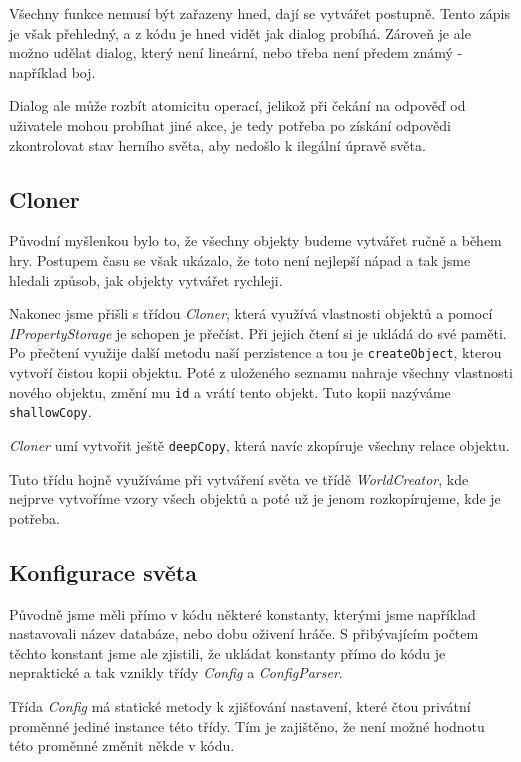\documentclass[11pt, a4paper]{article}
\def\class#1{\emph{#1}}
\begin{document}
Všechny funkce nemusí být zařazeny hned, dají se vytvářet postupně. Tento zápis je však přehledný, a z kódu je hned vidět jak dialog probíhá. Zároveň je ale možno udělat dialog, který není lineární, nebo třeba není předem známý - například boj.

Dialog ale může rozbít atomicitu operací, jelikož při čekání na odpověď od uživatele mohou probíhat jiné akce, je tedy potřeba po získání odpovědi zkontrolovat stav herního světa, aby nedošlo k ilegální úpravě světa.

\subsection{Cloner}

Původní myšlenkou bylo to, že všechny objekty budeme vytvářet ručně a během hry. Postupem času se však ukázalo, že toto není nejlepší nápad a tak jsme hledali způsob, jak objekty vytvářet rychleji.

Nakonec jsme přišli s třídou \class{Cloner}, která využívá vlastnosti objektů a pomocí \class{IPropertyStorage} je schopen je přečíst. Při jejich čtení si je ukládá do své paměti. Po přečtení využije další metodu naší perzistence a tou je \texttt{createObject}, kterou vytvoří čistou kopii objektu. Poté z uloženého seznamu nahraje všechny vlastnosti nového objektu, změní mu \texttt{id} a vrátí tento objekt. Tuto kopii nazýváme \texttt{shallowCopy}.

\class{Cloner} umí vytvořit ještě \texttt{deepCopy}, která navíc zkopíruje všechny relace objektu.

Tuto třídu hojně využíváme při vytváření světa ve třídě \class{WorldCreator}, kde nejprve vytvoříme vzory všech objektů a poté už je jenom rozkopírujeme, kde je potřeba.

\subsection{Konfigurace světa}

Původně jsme měli přímo v kódu některé konstanty, kterými jsme například nastavovali název databáze, nebo dobu oživení hráče. S přibývajícím počtem těchto konstant jsme ale zjistili, že ukládat konstanty přímo do kódu je nepraktické a tak vznikly třídy \class{Config} a \class{ConfigParser}. 

Třída \class{Config} má statické metody k zjišťování nastavení, které čtou privátní proměnné jediné instance této třídy. Tím je zajištěno, že není možné hodnotu této proměnné změnit někde v kódu. 
\end{document}

